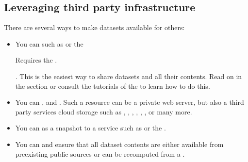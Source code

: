 \subsection{Leveraging third party infrastructure}
\label{\detokenize{basics/101-138-sharethirdparty:leveraging-third-party-infrastructure}}
\sphinxAtStartPar
There are several ways to make datasets available for others:
\begin{itemize}
\item {} 
\sphinxAtStartPar
You can  such as {\hyperref[\detokenize{glossary:term-GIN}]{}} or the %
\begin{footnote}\sphinxAtStartFootnote
Requires the .
%
\end{footnote}. This is the easiest way to share datasets and all their contents. Read on in the section  or consult the tutorials of the  to learn how to do this.

\item {} 
\sphinxAtStartPar
You can , and . Such a resource can be a private web server, but also a third party services cloud storage such as , , , , , , or many more.

\item {} 
\sphinxAtStartPar
You can  as a snapshot to a service such as   or the \sphinxfootnotemark[1].

\item {} 
\sphinxAtStartPar
You can  and ensure that
all dataset contents are either available from pre\sphinxhyphen{}existing public sources or can be recomputed from a {\hyperref[\detokenize{glossary:term-run-record}]{}}.

\end{itemize}


